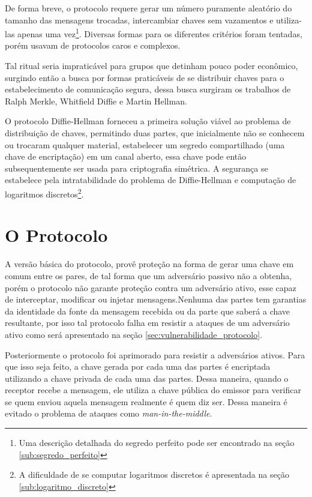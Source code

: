 \documentclass{article}
\begin{document}
De forma breve, o protocolo requere gerar um número puramente aleatório do
tamanho das mensagens trocadas, intercambiar chaves sem vazamentos e
utiliza-las apenas uma vez\footnote{Uma descrição detalhada do segredo
    perfeito pode ser encontrado na seção \ref{sub:segredo_perfeito}}.
Diversas formas para os diferentes critérios foram tentadas, porém usavam de
protocolos caros e complexos\cite{matsumoto1987key,Merkle}.

Tal ritual seria impraticável para grupos que detinham pouco poder econômico,
surgindo então a busca por formas praticáveis de se distribuir chaves para o
estabelecimento de comunicação segura, dessa busca surgiram os trabalhos de
Ralph Merkle, Whitfield Diffie e Martin Hellman.

O protocolo Diffie-Hellman forneceu a primeira solução viável ao problema
de distribuição de chaves, permitindo duas partes, que inicialmente não se
conhecem ou trocaram qualquer material, estabelecer um segredo compartilhado
(uma chave de encriptação) em um canal aberto, essa chave pode então
subsequentemente ser usada para criptografia simétrica. A segurança se
estabelece pela intratabilidade do problema de
Diffie-Hellman\cite{katz1996handbook} e computação de logaritmos
discretos\footnote{A dificuldade de se computar logaritmos discretos é
apresentada na seção \ref{sub:logaritmo_discreto}}.

\section{O Protocolo}%
\label{sec:o_protocolo}

A versão básica do protocolo, provê proteção na forma de gerar uma
chave em comum entre os pares, de tal forma que um adversário passivo não a
obtenha, porém o protocolo não garante proteção contra um adversário ativo,
esse capaz de interceptar, modificar ou injetar mensagens.Nenhuma das partes
tem garantias da identidade da fonte da mensagem recebida ou da parte que
saberá a chave resultante\cite{katz1996handbook}, por isso tal protocolo falha
em resistir a ataques de um adversário ativo como será apresentado na seção
\ref{sec:vulnerabilidade_protocolo}.

Posteriormente o protocolo foi aprimorado para resistir a adversários ativos.
Para que isso seja feito, a chave gerada por cada uma das partes é encriptada
utilizando a chave privada de cada uma das partes. Dessa maneira, quando o
receptor recebe a mensagem, ele utiliza a chave pública do emissor para
verificar se quem enviou aquela mensagem realmente é quem diz ser. Dessa
maneira é evitado o problema de ataques como \textit{man-in-the-middle}.
\end{document}
